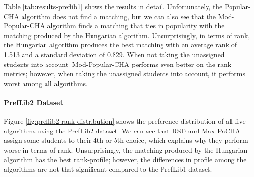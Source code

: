 \begin{table}[h!]
  \centering
  \caption{Summary of the results for PrefLib1}
  \label{tab:results-preflib1}
\end{table}

Table \ref{tab:results-preflib1} shows the results in detail. Unfortunately, the Popular-CHA algorithm does not find a matching, but we can also see that the Mod-Popular-CHA algorithm finds a matching that ties in popularity with the matching produced by the Hungarian algorithm. Unsurprisingly, in terms of rank, the Hungarian algorithm produces the best matching with an average rank of 1.513 and a standard deviation of 0.829. When not taking the unassigned students into account, Mod-Popular-CHA performs even better on the rank metrics; however, when taking the unassigned students into account, it performs worst among all algorithms.


\paragraph{PrefLib2 Dataset}
Figure \ref{fig:preflib2-rank-distribution} shows the preference distribution of all five algorithms using the PrefLib2 dataset. We can see that RSD and Max-PaCHA assign some students to their 4th or 5th choice, which explains why they perform worse in terms of rank. Unsurprisingly, the matching produced by the Hungarian algorithm has the best rank-profile; however, the differences in profile among the algorithms are not that significant compared to the PrefLib1 dataset.

